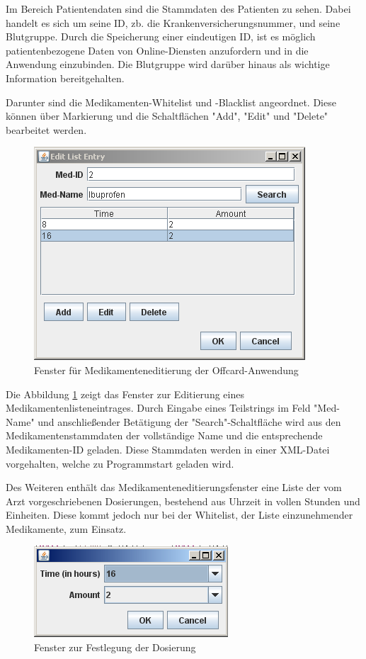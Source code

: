 \documentclass[parskip]{scrartcl}
\begin{document}
		Im Bereich Patientendaten sind die Stammdaten des Patienten zu sehen. Dabei handelt es sich um seine ID, zb. die Krankenversicherungsnummer, und seine Blutgruppe. Durch die Speicherung einer eindeutigen ID, ist es möglich patientenbezogene Daten von Online-Diensten anzufordern und in die Anwendung einzubinden. Die Blutgruppe wird darüber hinaus als wichtige Information bereitgehalten.
		
		Darunter sind die Medikamenten-Whitelist und -Blacklist angeordnet. Diese können über Markierung und die Schaltflächen "Add", "Edit" und "Delete" bearbeitet werden.
		
		\begin{figure}[H]
			\centering
			\includegraphics[width=.6\linewidth]{./mededitgui.png}
			\caption{Fenster für Medikamenteneditierung der Offcard-Anwendung}
			\label{fig:mededit}
		\end{figure}
		
		Die Abbildung \ref{fig:mededit} zeigt das Fenster zur Editierung eines Medikamentenlisteneintrages. Durch Eingabe eines Teilstrings im Feld "Med-Name" und anschließender Betätigung der "Search"-Schaltfläche wird aus den Medikamentenstammdaten der vollständige Name und die entsprechende Medikamenten-ID geladen. Diese Stammdaten werden in einer XML-Datei vorgehalten, welche zu Programmstart geladen wird.
		
		Des Weiteren enthält das Medikamenteneditierungsfenster eine Liste der vom Arzt vor\-ge\-schrie\-ben\-en Dosierungen, bestehend aus Uhrzeit in vollen Stunden und Einheiten. Diese kommt jedoch nur bei der Whitelist, der Liste einzunehmender Medikamente, zum Einsatz. 
		
		\begin{figure}[H]
			\centering
			\includegraphics[width=.4\linewidth]{./dosageeditgui.png}
			\caption{Fenster zur Festlegung der Dosierung}
			\label{fig:dosageedit}
		\end{figure}
		
\end{document}
